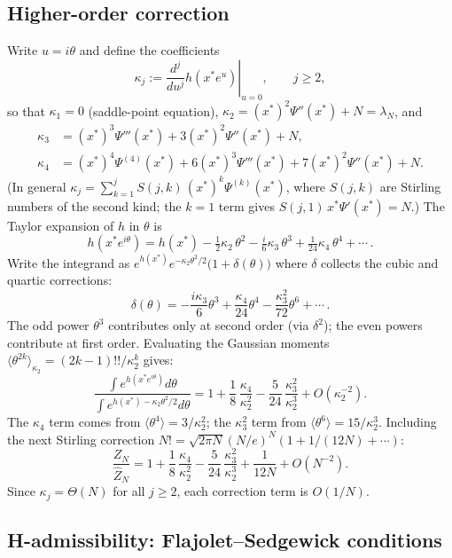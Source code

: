 \documentclass[11pt]{amsart}
\newcommand{\GFensemble}{Z}
\newcommand{\GFcomb}{\Psi}
\theoremstyle{definition}
\theoremstyle{plain}
\theoremstyle{remark}
\begin{document}
\subsection{Higher-order correction}

Write $u=i\theta$ and define the coefficients
\[
\kappa_j
:= \left.\frac{d^j}{du^j}h(x^*e^{u})\right|_{u=0},
\qquad j\ge 2,
\]
so that $\kappa_1=0$ (saddle-point equation), $\kappa_2 = (x^*)^2\GFcomb''(x^*)+N = \lambda_N$, and
\begin{align*}
\kappa_3 &= (x^*)^3\GFcomb'''(x^*) + 3(x^*)^2\GFcomb''(x^*) + N,\\
\kappa_4 &= (x^*)^4\GFcomb^{(4)}(x^*) + 6(x^*)^3\GFcomb'''(x^*) + 7(x^*)^2\GFcomb''(x^*) + N.
\end{align*}
(In general $\kappa_j = \sum_{k=1}^{j}S(j,k)\,(x^*)^k\GFcomb^{(k)}(x^*)$, where $S(j,k)$ are Stirling numbers of the second kind; the $k=1$ term gives $S(j,1)\,x^*\GFcomb'(x^*) = N$.)
The Taylor expansion of $h$ in $\theta$ is
\[
h(x^*e^{i\theta})
= h(x^*) - \tfrac{1}{2}\kappa_2\,\theta^2
- \tfrac{i}{6}\kappa_3\,\theta^3
+ \tfrac{1}{24}\kappa_4\,\theta^4
+ \cdots\,.
\]
Write the integrand as $e^{h(x^*)}e^{-\kappa_2\theta^2/2}\bigl(1 + \delta(\theta)\bigr)$ where $\delta$ collects the cubic and quartic corrections:
\[
\delta(\theta) = -\frac{i\kappa_3}{6}\theta^3 + \frac{\kappa_4}{24}\theta^4 - \frac{\kappa_3^2}{72}\theta^6 + \cdots\,.
\]
The odd power $\theta^3$ contributes only at second order (via $\delta^2$); the even powers contribute at first order.
Evaluating the Gaussian moments $\langle \theta^{2k}\rangle_{\kappa_2} = (2k{-}1)!!/\kappa_2^k$ gives:
\[
\frac{\int e^{h(x^*e^{i\theta})}d\theta}
     {\int e^{h(x^*)-\kappa_2\theta^2/2}d\theta}
= 1
+ \frac{1}{8}\,\frac{\kappa_4}{\kappa_2^2}
- \frac{5}{24}\,\frac{\kappa_3^2}{\kappa_2^3}
+ O\!\left(\kappa_2^{-2}\right).
\]
The $\kappa_4$ term comes from $\langle\theta^4\rangle = 3/\kappa_2^2$; the $\kappa_3^2$ term from $\langle\theta^6\rangle = 15/\kappa_2^3$.
Including the next Stirling correction $N! = \sqrt{2\pi N}(N/e)^N(1+1/(12N)+\cdots)$:
\begin{equation}\label{eq:app_error_expansion}
\frac{\GFensemble_N}{\widehat{\GFensemble}_N}
= 1
+ \frac{1}{8}\,\frac{\kappa_4}{\kappa_2^2}
- \frac{5}{24}\,\frac{\kappa_3^2}{\kappa_2^3}
+ \frac{1}{12N}
+ O\!\left(N^{-2}\right).
\end{equation}
Since $\kappa_j=\Theta(N)$ for all $j\ge 2$, each correction term is $O(1/N)$.

\subsection{H-admissibility: Flajolet--Sedgewick conditions}
\label{app:saddle_admissibility}
\end{document}
